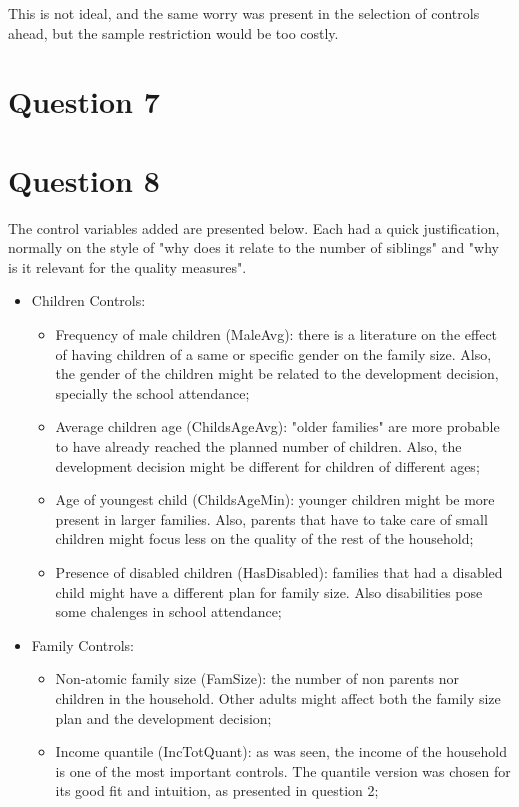 \documentclass[12pt]{article}
\begin{document}
This is not ideal, and the same worry was present in the selection of controls ahead, but the sample restriction would be too costly.


\section*{Question 7}


\section*{Question 8}
The control variables added are presented below. Each had a quick justification, normally on the style of "why does it relate to the number of siblings" and "why is it relevant for the quality measures".

\begin{itemize}
    \item Children Controls:
    \begin{itemize}
        \item Frequency of male children (MaleAvg): there is a literature on the effect of having children of a same or specific gender on the family size. Also, the gender of the children might be related to the development decision, specially the school attendance;
        \item Average children age (ChildsAgeAvg): "older families" are more probable to have already reached the planned number of children. Also,  the development decision might be different for children of different ages;
        \item Age of youngest child (ChildsAgeMin): younger children might be more present in larger families. Also, parents that have to take care of small children might focus less on the quality of the rest of the household;
        \item Presence of disabled children (HasDisabled): families that had a disabled child might have a different plan for family size. Also disabilities pose some chalenges in school attendance;
    \end{itemize}
    \item Family Controls:
    \begin{itemize}
        \item Non-atomic family size (FamSize): the number of non parents nor children in the household. Other adults might affect both the family size plan and the development decision;
        \item Income quantile (IncTotQuant): as was seen, the income of the household is one of the most important controls. The quantile version was chosen for its good fit and intuition, as presented in question 2;

\end{itemize}
\end{itemize}
\end{document}
